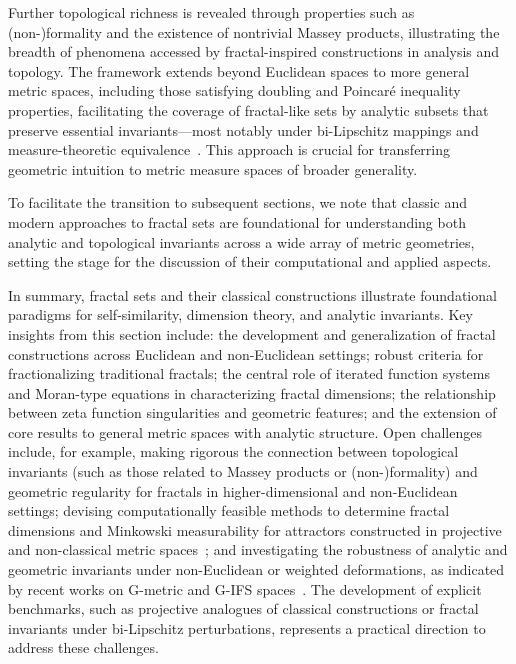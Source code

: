 \documentclass[sigconf]{acmart}
\begin{document}
Further topological richness is revealed through properties such as (non-)formality and the existence of nontrivial Massey products, illustrating the breadth of phenomena accessed by fractal-inspired constructions in analysis and topology. The framework extends beyond Euclidean spaces to more general metric spaces, including those satisfying doubling and Poincaré inequality properties, facilitating the coverage of fractal-like sets by analytic subsets that preserve essential invariants—most notably under bi-Lipschitz mappings and measure-theoretic equivalence~\cite{ref23,ref93,ref6}. This approach is crucial for transferring geometric intuition to metric measure spaces of broader generality.

To facilitate the transition to subsequent sections, we note that classic and modern approaches to fractal sets are foundational for understanding both analytic and topological invariants across a wide array of metric geometries, setting the stage for the discussion of their computational and applied aspects.

In summary, fractal sets and their classical constructions illustrate foundational paradigms for self-similarity, dimension theory, and analytic invariants. Key insights from this section include: the development and generalization of fractal constructions across Euclidean and non-Euclidean settings; robust criteria for fractionalizing traditional fractals; the central role of iterated function systems and Moran-type equations in characterizing fractal dimensions; the relationship between zeta function singularities and geometric features; and the extension of core results to general metric spaces with analytic structure. Open challenges include, for example, making rigorous the connection between topological invariants (such as those related to Massey products or (non-)formality) and geometric regularity for fractals in higher-dimensional and non-Euclidean settings; devising computationally feasible methods to determine fractal dimensions and Minkowski measurability for attractors constructed in projective and non-classical metric spaces~\cite{ref33,ref93}; and investigating the robustness of analytic and geometric invariants under non-Euclidean or weighted deformations, as indicated by recent works on G-metric and G-IFS spaces~\cite{ref6}. The development of explicit benchmarks, such as projective analogues of classical constructions or fractal invariants under bi-Lipschitz perturbations, represents a practical direction to address these challenges.
\end{document}
